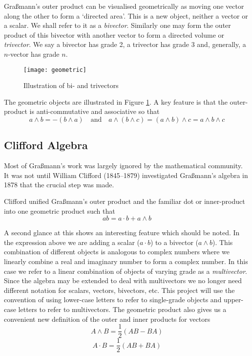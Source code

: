 Gra{\ss}mann's outer product can be visualised geometrically as moving
one vector along the other to form a `directed area'. This is a new object,
neither a vector or a scalar. We shall refer to it as a \emph{bivector}.
Similarly one may form the outer product of this bivector with another
vector to form a directed volume or \emph{trivector}. We say a 
bivector has grade 2, a trivector has grade 3 and, generally, a
$n$-vector has grade $n$.

\begin{figure}
\centering
\texttt{[image: geometric]}
\caption{Illustration of bi- and trivectors\label{fig:geometric}}
\end{figure}

The geometric objects are illustrated in Figure \ref{fig:geometric}. A 
key feature is that the outer-product is anti-commutative and 
associative so that
\begin{displaymath}
a \wedge b = - ( b \wedge a)\quad\mbox{and}\quad 
a \wedge (b \wedge c) = (a \wedge b) \wedge c = a \wedge b \wedge c
\end{displaymath}

\subsection{Clifford Algebra}

Most of Gra{\ss}mann's work was largely ignored by the mathematical community.
It was not until William Clifford (1845--1879) investigated Gra{\ss}mann's
algebra in 1878 \cite{clifford} that the crucial step was made.

Clifford unified Gra{\ss}mann's outer product and the familiar dot
or inner-product into one geometric product such that
\begin{displaymath}
ab = a\cdot b + a \wedge b
\end{displaymath}

A second glance at this shows an interesting feature which should be noted.
In the expression above we are adding a scalar ($a \cdot b$) to a 
bivector ($a \wedge b$). This combination of different objects is
analogous to complex numbers where we linearly combine
a real and imaginary number to form a complex number. In this case we
refer to a linear combination of objects of varying grade as a
\emph{multivector}. Since the algebra may be extended to deal with
multivectors we no longer need different notation for scalars, vectors,
bivectors, etc. This project will use the convention of using lower-case
letters to refer to single-grade objects and upper-case letters to refer
to multivectors. The geometric product also gives us a convenient new
definition of the outer and inner products for vectors
\[
A \wedge B = \frac{1}{2}(AB - BA)
\]
\[
A \cdot B = \frac{1}{2}(AB + BA)
\]

